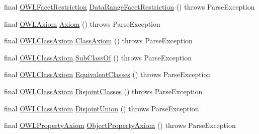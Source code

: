 \begin{DoxyCompactItemize}
\item 
final \hyperlink{interfaceorg_1_1semanticweb_1_1owlapi_1_1model_1_1_o_w_l_facet_restriction}{O\-W\-L\-Facet\-Restriction} \hyperlink{classorg_1_1coode_1_1owlapi_1_1functionalparser_1_1_o_w_l_functional_syntax_parser_a30f1d4b353fc08eee6a28e826ba7f91d}{Data\-Range\-Facet\-Restriction} ()  throws Parse\-Exception 
\item 
final \hyperlink{interfaceorg_1_1semanticweb_1_1owlapi_1_1model_1_1_o_w_l_axiom}{O\-W\-L\-Axiom} \hyperlink{classorg_1_1coode_1_1owlapi_1_1functionalparser_1_1_o_w_l_functional_syntax_parser_ab1b90153ef31a2fcec8a62661a45e51a}{Axiom} ()  throws Parse\-Exception 
\item 
final \hyperlink{interfaceorg_1_1semanticweb_1_1owlapi_1_1model_1_1_o_w_l_class_axiom}{O\-W\-L\-Class\-Axiom} \hyperlink{classorg_1_1coode_1_1owlapi_1_1functionalparser_1_1_o_w_l_functional_syntax_parser_acce368ac9791152cdc5c86f8c8293d66}{Class\-Axiom} ()  throws Parse\-Exception 
\item 
final \hyperlink{interfaceorg_1_1semanticweb_1_1owlapi_1_1model_1_1_o_w_l_class_axiom}{O\-W\-L\-Class\-Axiom} \hyperlink{classorg_1_1coode_1_1owlapi_1_1functionalparser_1_1_o_w_l_functional_syntax_parser_a945da63ccd67ee8fadc2befcd4f6ce4d}{Sub\-Class\-Of} ()  throws Parse\-Exception 
\item 
final \hyperlink{interfaceorg_1_1semanticweb_1_1owlapi_1_1model_1_1_o_w_l_class_axiom}{O\-W\-L\-Class\-Axiom} \hyperlink{classorg_1_1coode_1_1owlapi_1_1functionalparser_1_1_o_w_l_functional_syntax_parser_a21a7519706285f398a7fd46efcfb03e8}{Equivalent\-Classes} ()  throws Parse\-Exception 
\item 
final \hyperlink{interfaceorg_1_1semanticweb_1_1owlapi_1_1model_1_1_o_w_l_class_axiom}{O\-W\-L\-Class\-Axiom} \hyperlink{classorg_1_1coode_1_1owlapi_1_1functionalparser_1_1_o_w_l_functional_syntax_parser_a14833e6e95a85dbf7d389848aa752278}{Disjoint\-Classes} ()  throws Parse\-Exception 
\item 
final \hyperlink{interfaceorg_1_1semanticweb_1_1owlapi_1_1model_1_1_o_w_l_class_axiom}{O\-W\-L\-Class\-Axiom} \hyperlink{classorg_1_1coode_1_1owlapi_1_1functionalparser_1_1_o_w_l_functional_syntax_parser_af98df12c43498f5510d881b966f8c405}{Disjoint\-Union} ()  throws Parse\-Exception 
\item 
final \hyperlink{interfaceorg_1_1semanticweb_1_1owlapi_1_1model_1_1_o_w_l_property_axiom}{O\-W\-L\-Property\-Axiom} \hyperlink{classorg_1_1coode_1_1owlapi_1_1functionalparser_1_1_o_w_l_functional_syntax_parser_ab5071361bbbf80671ffa98293ccd7a04}{Object\-Property\-Axiom} ()  throws Parse\-Exception 

\end{DoxyCompactItemize}
